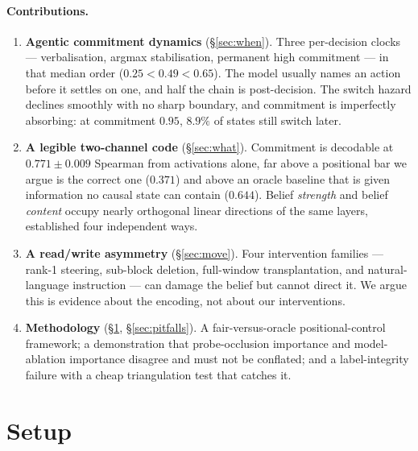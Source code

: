 \documentclass{article}
\begin{document}
\paragraph{Contributions.}
\begin{enumerate}[leftmargin=1.4em,itemsep=1pt,topsep=2pt]
\item \textbf{Agentic commitment dynamics} (\S\ref{sec:when}). Three per-decision clocks
--- verbalisation, argmax stabilisation, permanent high commitment --- in that median
order ($0.25 < 0.49 < 0.65$). The model usually names an action before it settles on one,
and half the chain is post-decision. The switch hazard declines smoothly with no sharp
boundary, and commitment is imperfectly absorbing: at commitment $0.95$, $8.9\%$ of states
still switch later.

\item \textbf{A legible two-channel code} (\S\ref{sec:what}). Commitment is decodable at
$0.771 \pm 0.009$ Spearman from activations alone, far above a positional bar we argue is
the correct one ($0.371$) and above an oracle baseline that is given information no causal
state can contain ($0.644$). Belief \emph{strength} and belief \emph{content} occupy
nearly orthogonal linear directions of the same layers, established four independent ways.

\item \textbf{A read/write asymmetry} (\S\ref{sec:move}). Four intervention families ---
rank-1 steering, sub-block deletion, full-window transplantation, and natural-language
instruction --- can damage the belief but cannot direct it. We argue this is evidence
about the encoding, not about our interventions.

\item \textbf{Methodology} (\S\ref{sec:setup}, \S\ref{sec:pitfalls}). A fair-versus-oracle
positional-control framework; a demonstration that probe-occlusion importance and
model-ablation importance disagree and must not be conflated; and a label-integrity
failure with a cheap triangulation test that catches it.
\end{enumerate}

\section{Setup}
\label{sec:setup}
\end{document}
